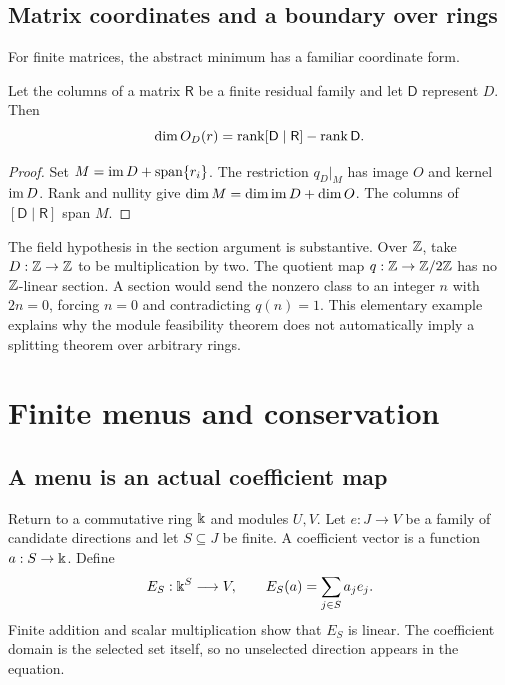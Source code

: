 \subsection{Matrix coordinates and a boundary over rings}
For finite matrices, the abstract minimum has a familiar coordinate form.

\begin{CRcorollary}\label{CR:cor:rank-difference}
Let the columns of a matrix $\mathsf R$ be a finite residual family and let $\mathsf D$ represent $D$. Then
\[
\dim O_D(r)=\operatorname{rank}[\mathsf D\mid\mathsf R]-\operatorname{rank}\mathsf D.
\]
\end{CRcorollary}
\begin{proof}
Set $M=\operatorname{im} D+\operatorname{span}\{r_i\}$. The restriction $q_D\vert_M$ has image $O$ and kernel $\operatorname{im} D$. Rank and nullity give $\dim M=\dim\operatorname{im} D+\dim O$. The columns of $[\mathsf D\mid\mathsf R]$ span $M$.
\end{proof}

The field hypothesis in the section argument is substantive. Over $\mathbb{Z}$, take $D:\mathbb{Z}\to\mathbb{Z}$ to be multiplication by two. The quotient map $q:\mathbb{Z}\to\mathbb{Z}/2\mathbb{Z}$ has no $\mathbb{Z}$-linear section. A section would send the nonzero class to an integer $n$ with $2n=0$, forcing $n=0$ and contradicting $q(n)=1$. This elementary example explains why the module feasibility theorem does not automatically imply a splitting theorem over arbitrary rings.



\section{Finite menus and conservation}\label{CR:cr-source-section-3}\label{CR:ch:menu}
\subsection{A menu is an actual coefficient map}
Return to a commutative ring $\Bbbk$ and modules $U,V$. Let $e:J\to V$ be a family of candidate directions and let $S\subseteq J$ be finite. A coefficient vector is a function $a:S\to\Bbbk$. Define
\begin{equation}\label{CR:eq:menu}
E_S:\Bbbk^S\longrightarrow V,\qquad E_S(a)=\sum_{j\in S}a_je_j.
\end{equation}
Finite addition and scalar multiplication show that $E_S$ is linear. The coefficient domain is the selected set itself, so no unselected direction appears in the equation.

